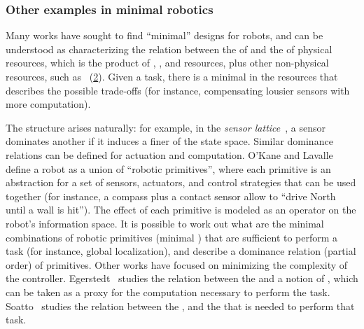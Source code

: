 \begin{figure}[h!]
    \centering
    \caption{}
    \label{fig:dp_zia}
\end{figure}

\subsubsection{Other examples in minimal robotics}

Many works have sought to find ``minimal'' designs for robots, and can be understood as characterizing the relation between the  of  and the  of physical resources, which is the product of , , and  resources, plus other non-physical resources, such as ~(\cref{fig:robot-generic}).
Given a task, there is a minimal  in the resources  that describes the possible trade-offs (for instance, compensating lousier sensors with more computation).


\begin{figure}
    \centering
    \caption{}
    \label{fig:robot-generic}
\end{figure}


The  structure arises naturally: for example, in the \emph{sensor lattice}~\cite{lavalle12sensing}, a sensor dominates another if it induces a finer  of the state space.
Similar dominance relations can be defined for actuation and computation.
O'Kane and Lavalle~\cite{okane08comparing} define a robot as a union of ``robotic primitives'', where each primitive is an abstraction for a set of sensors, actuators, and control strategies that can be used together
(for instance, a compass plus a contact sensor allow to ``drive North until a wall is hit'').
The effect of each primitive is modeled as an operator on the robot's information space.
It is possible to work out what are the minimal combinations of robotic primitives (minimal ) that are sufficient to perform a task (for instance, global localization), and describe a dominance relation (partial order) of primitives.
Other works have focused on minimizing the complexity of the controller.
Egerstedt~\cite{egerstedt03motion} studies the relation between the  and a notion of , which can be taken as a proxy for the computation necessary to perform the task.
Soatto~\cite{soatto11steps} studies the relation between the , and the  that is needed to perform that task.

